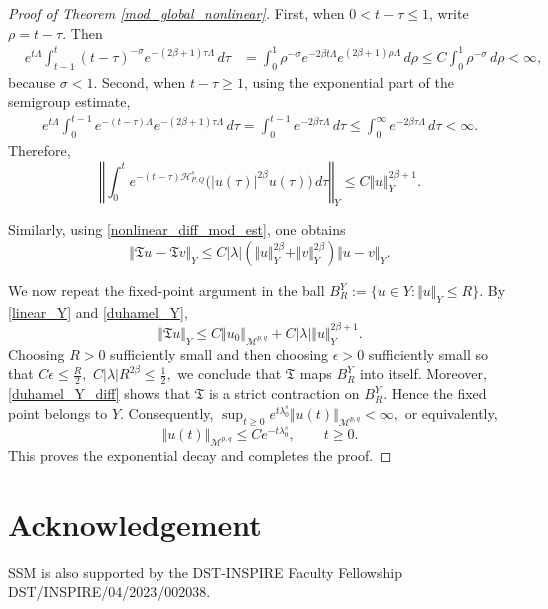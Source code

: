 \documentclass[12pt, reqno]{amsart}
\theoremstyle{definition}
\theoremstyle{remark}
\numberwithin{equation}{section}
\newcommand{\APQ}{\mathcal{H}_{P, Q}}
\begin{document}
\begin{proof}[Proof of Theorem \ref{mod_global_nonlinear}]
First, when $0<t-\tau\leq1$, write $\rho=t-\tau$. Then
\[
\begin{aligned}
&e^{t\Lambda}
\int_{t-1}^{t}
(t-\tau)^{-\sigma}
e^{-(2\beta+1)\tau\Lambda}\,d\tau &
=
\int_0^1
\rho^{-\sigma}
e^{-2\beta t\Lambda}
e^{(2\beta+1)\rho\Lambda}
\,d\rho
\leq
C
\int_0^1
\rho^{-\sigma}\,d\rho
<\infty,
\end{aligned}
\]
because $\sigma<1$. Second, when $t-\tau\geq1$, using the exponential part of the semigroup estimate,
\[
\begin{aligned}
e^{t\Lambda}
\int_0^{t-1}
e^{-(t-\tau)\Lambda}
e^{-(2\beta+1)\tau\Lambda}
\,d\tau
=
\int_0^{t-1}
e^{-2\beta \tau\Lambda}
\,d\tau
\leq
\int_0^\infty
e^{-2\beta \tau\Lambda}
\,d\tau
<\infty.
\end{aligned}
\]
Therefore,
\begin{equation}
\label{duhamel_Y}
    \left\Vert
    \int_0^t
    e^{-(t-\tau)\APQ^s}
    \big(|u(\tau)|^{2\beta}u(\tau)\big)
    \,d\tau
    \right\Vert_Y
    \leq
    C
    \Vert u\Vert_Y^{2\beta+1}.
\end{equation}

Similarly, using \eqref{nonlinear_diff_mod_est}, one obtains
\begin{equation}
\label{duhamel_Y_diff}
    \Vert \mathfrak T u-\mathfrak T v\Vert_Y
    \leq
    C|\lambda|
    \left(
    \Vert u\Vert_Y^{2\beta}
    +
    \Vert v\Vert_Y^{2\beta}
    \right)
    \Vert u-v\Vert_Y.
\end{equation}

We now repeat the fixed-point argument in the ball $ B_R^Y:=\{u\in Y:\Vert u\Vert_Y\leq R\}.$
By \eqref{linear_Y} and \eqref{duhamel_Y},
\[
    \Vert \mathfrak T u\Vert_Y
    \leq
    C\Vert u_0\Vert_{\mathcal M^{p,q}}
    +
    C|\lambda|
    \Vert u\Vert_Y^{2\beta+1}.
\]
Choosing $R>0$ sufficiently small and then choosing $\epsilon>0$
sufficiently small so that $C\epsilon\leq \frac R2,
   \,\,
    C|\lambda|R^{2\beta}\leq \frac12,$
we conclude that $\mathfrak T$ maps $B_R^Y$ into itself. Moreover, \eqref{duhamel_Y_diff} shows that $\mathfrak T$ is a strict contraction on $B_R^Y$. Hence the fixed point belongs to $Y$. Consequently, $  \sup_{t\geq0}
    e^{t\lambda_0^s}
    \Vert u(t)\Vert_{\mathcal M^{p,q}}
    <\infty,$
or equivalently,
\[
    \Vert u(t)\Vert_{\mathcal M^{p,q}}
    \leq
    C e^{-t\lambda_0^s},
    \qquad t\geq0.
\]
This proves the exponential decay and completes the proof.
\end{proof}


\section*{Acknowledgement}
 SSM is also supported by the DST-INSPIRE Faculty Fellowship DST/INSPIRE/04/2023/002038.
\end{document}

